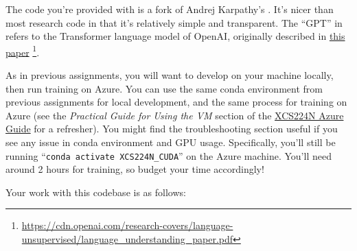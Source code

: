 
The code you're provided with is a fork of Andrej Karpathy's \href{https://github.com/karpathy/minGPT}{\mingpt}.
It's nicer than most research code in that it's relatively simple and transparent.
The ``GPT'' in \mingpt refers to the Transformer language model of OpenAI, originally described in \href{https://cdn.openai.com/research-covers/language-unsupervised/language_understanding_paper.pdf}{this paper} \footnote{\url{https://cdn.openai.com/research-covers/language-unsupervised/language_understanding_paper.pdf}}.


As in previous assignments, you will want to develop on your machine locally, then run training on Azure. You can use the same conda environment from previous assignments for local development, and the same process for training on Azure (see the \textit{Practical Guide for Using the VM} section of the \href{https://docs.google.com/document/d/10J520Vnb1LnAMo0qgSYpG5cEEbomqQ371NIqg1IAv-4/edit?usp=sharing}{XCS224N Azure Guide} for a refresher). You might find the troubleshooting section useful if you see any issue in conda environment and GPU usage. Specifically, you'll still be running ``\texttt{conda activate XCS224N\_CUDA}'' on the Azure machine. You'll need around 2 hours for training, so budget your time accordingly!

Your work with this codebase is as follows:

